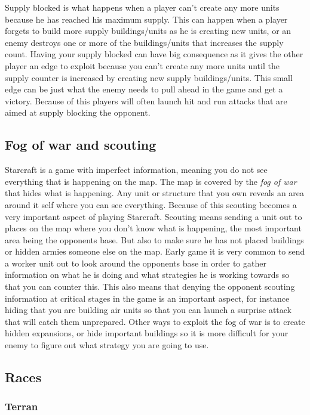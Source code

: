 Supply blocked is what happens when a player can't create any more units because he has reached his maximum supply. This can happen when a player forgets to build more supply buildings/units as he is creating new units, or an enemy destroys one or more of the buildings/units that increases the supply count. Having your supply blocked can have big consequence as it gives the other player an edge to exploit because you can't create any more units until the supply counter is increased by creating new supply buildings/units. This small edge can be just what the enemy needs to pull ahead in the game and get a victory. Because of this players will often launch hit and run attacks that are aimed at supply blocking the opponent. 

\subsection{Fog of war and scouting}
Starcraft is a game with imperfect information, meaning you do not see everything that is happening on the map. The map is covered by the \textit{fog of war} that hides what is happening. Any unit or structure that you own reveals an area around it self where you can see everything. Because of this scouting becomes a very important aspect of playing Starcraft. Scouting means sending a unit out to places on the map where you don't know what is happening, the most important area being the opponents base. But also to make sure he has not placed buildings or hidden armies someone else on the map. Early game it is very common to send a worker unit out to look around the opponents base in order to gather information on what he is doing and what strategies he is working towards so that you can counter this. This also means that denying the opponent scouting information at critical stages in the game is an important aspect, for instance hiding that you are building air units so that you can launch a surprise attack that will catch them unprepared. Other ways to exploit the fog of war is to create hidden expansions, or hide important buildings so it is more difficult for your enemy to figure out what strategy you are going to use. 

\subsection{Races}

\subsubsection{Terran}


